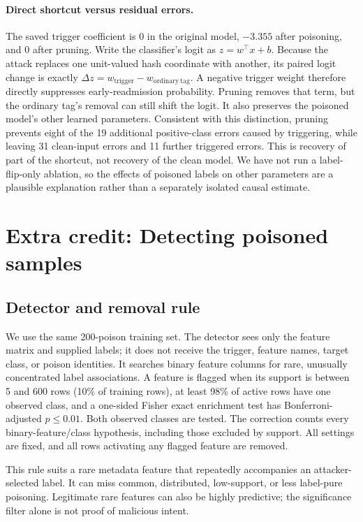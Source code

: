\documentclass[letterpaper,twocolumn,10pt]{article}
\begin{document}
\paragraph{Direct shortcut versus residual errors.}
The saved trigger coefficient is $0$ in the original model, $-3.355$ after poisoning, and $0$ after pruning. Write the classifier's logit as $z=w^\top x+b$. Because the attack replaces one unit-valued hash coordinate with another, its paired logit change is exactly $\Delta z=w_{\mathrm{trigger}}-w_{\mathrm{ordinary\ tag}}$. A negative trigger weight therefore directly suppresses early-readmission probability. Pruning removes that term, but the ordinary tag's removal can still shift the logit. It also preserves the poisoned model's other learned parameters. Consistent with this distinction, pruning prevents eight of the 19 additional positive-class errors caused by triggering, while leaving 31 clean-input errors and 11 further triggered errors. This is recovery of part of the shortcut, not recovery of the clean model. We have not run a label-flip-only ablation, so the effects of poisoned labels on other parameters are a plausible explanation rather than a separately isolated causal estimate.

\section{Extra credit: Detecting poisoned samples}
\subsection{Detector and removal rule}
We use the same 200-poison training set. The detector sees only the feature matrix and supplied labels; it does not receive the trigger, feature names, target class, or poison identities. It searches binary feature columns for rare, unusually concentrated label associations. A feature is flagged when its support is between 5 and 600 rows (10\% of training rows), at least 98\% of active rows have one observed class, and a one-sided Fisher exact enrichment test has Bonferroni-adjusted $p\leq0.01$. Both observed classes are tested. The correction counts every binary-feature/class hypothesis, including those excluded by support. All settings are fixed, and all rows activating any flagged feature are removed.

This rule suits a rare metadata feature that repeatedly accompanies an attacker-selected label. It can miss common, distributed, low-support, or less label-pure poisoning. Legitimate rare features can also be highly predictive; the significance filter alone is not proof of malicious intent.
\end{document}
